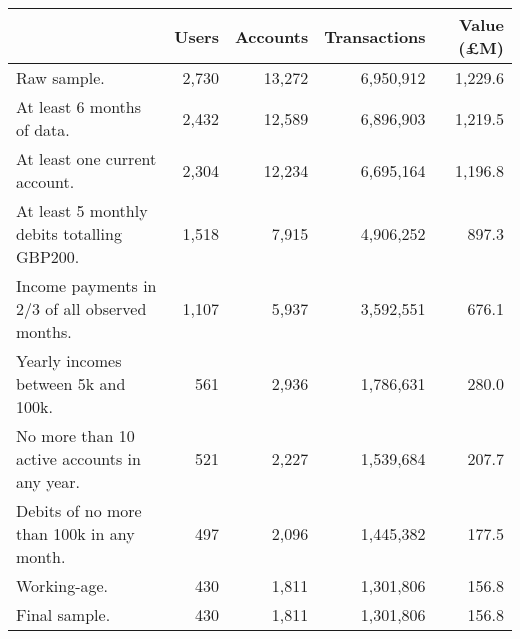 \begin{tabular}{lrrrr}
\toprule
                                               & Users & Accounts & Transactions & Value (\pounds M) \\
\midrule
                                   Raw sample. & 2,730 &   13,272 &    6,950,912 &           1,229.6 \\
                    At least 6 months of data. & 2,432 &   12,589 &    6,896,903 &           1,219.5 \\
                 At least one current account. & 2,304 &   12,234 &    6,695,164 &           1,196.8 \\
   At least 5 monthly debits totalling GBP200. & 1,518 &    7,915 &    4,906,252 &             897.3 \\
Income payments in 2/3 of all observed months. & 1,107 &    5,937 &    3,592,551 &             676.1 \\
           Yearly incomes between 5k and 100k. &   561 &    2,936 &    1,786,631 &             280.0 \\
  No more than 10 active accounts in any year. &   521 &    2,227 &    1,539,684 &             207.7 \\
     Debits of no more than 100k in any month. &   497 &    2,096 &    1,445,382 &             177.5 \\
                                  Working-age. &   430 &    1,811 &    1,301,806 &             156.8 \\
                                 Final sample. &   430 &    1,811 &    1,301,806 &             156.8 \\
\bottomrule
\end{tabular}
